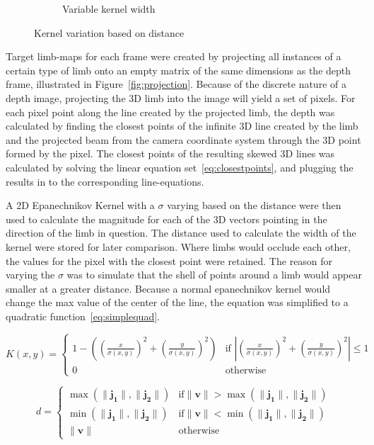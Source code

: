 \begin{figure}
\begin{subfigure}{.6\textwidth}
    \caption{Variable kernel width}
    \label{fig:magnitude}
  \end{subfigure}
  \caption{Kernel variation based on distance}
  \label{fig:kernelvariation}
\end{figure}

Target limb-maps for each frame were created by projecting all instances of a certain type of limb onto an empty matrix of the same dimensions as the depth frame, illustrated in Figure~\ref{fig:projection}. Because of the discrete nature of a depth image, projecting the 3D limb into the image will yield a set of pixels. For each pixel point along the line created by the projected limb, the depth was calculated by finding the closest points of the infinite 3D line created by the limb and the projected beam from the camera coordinate system through the 3D point formed by the pixel. The closest points of the resulting skewed 3D lines was calculated by solving the linear equation set~\ref{eq:closestpoints}, and plugging the results in to the corresponding line-equations.

A 2D Epanechnikov Kernel with a $\sigma$ varying based on the distance were then used to calculate the magnitude for each of the 3D vectors pointing in the direction of the limb in question. The distance used to calculate the width of the kernel were stored for later comparison. Where limbs would occlude each other, the values for the pixel with the closest point were retained. The reason for varying the $\sigma$ was to simulate that the shell of points around a limb would appear smaller at a greater distance. Because a normal epanechnikov kernel would change the max value of the center of the line, the equation was simplified to a quadratic function~\ref{eq:simplequad}.

\begin{equation}
  \label{eq:simplequad}
  K(x, y) =
  \begin{cases}
    1 - ((\frac{x}{\sigma(x, y)})^{2} + (\frac{y}{\sigma(x, y)})^{2}) & \text{if } |(\frac{x}{\sigma(x, y)})^{2} + (\frac{y}{\sigma(x, y)})^{2}| \leq 1\\
    0 & \text{otherwise}
  \end{cases}
\end{equation}

\begin{equation}
  \label{eq:depth}
  d =
  \begin{cases}
    \max(\|\mathbf{j_1}\|, \|\mathbf{j_2}\|) & \text{if} \|\mathbf{v}\| >  \max(\|\mathbf{j_1}\|, \|\mathbf{j_2}\|) \\
    \min(\|\mathbf{j_1}\|, \|\mathbf{j_2}\|) & \text{if} \|\mathbf{v}\| <  \min(\|\mathbf{j_1}\|, \|\mathbf{j_2}\|) \\    
    \|\mathbf{v}\| & \text{otherwise}
  \end{cases}
\end{equation}

